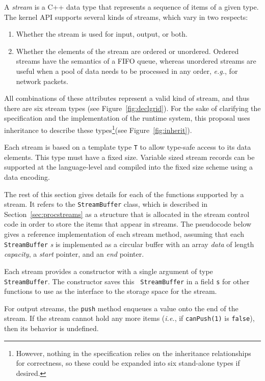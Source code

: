 A {\it stream} is a C++ data type that represents a sequence of items
of a given type.  The kernel API supports several kinds of streams,
which vary in two respects: 
\begin{enumerate}

\item Whether the stream is used for input, output, or both.

\item Whether the elements of the stream are ordered or unordered.
Ordered streams have the semantics of a FIFO queue, whereas unordered
streams are useful when a pool of data needs to be processed in any
order, {\it e.g.}, for network packets.

\end{enumerate}
All combinations of these attributes represent a valid kind of stream,
and thus there are six stream types (see Figure~\ref{fig:declgrid}).
For the sake of clarifying the specification and the implementation of
the runtime system, this proposal uses inheritance to describe these
types\footnote{However, nothing in the specification relies on the
inheritance relationships for correctness, so these could be expanded
into six stand-alone types if desired.}(see Figure~\ref{fig:inherit}).

Each stream is based on a template type {\tt T} to allow type-safe
access to its data elements.  This type must have a fixed size.
Variable sized stream records can be supported at the language-level
and compiled into the fixed size scheme using a data encoding.

The rest of this section gives details for each of the functions
supported by a stream.  It refers to the {\tt StreamBuffer} class,
which is described in Section~\ref{sec:procstreams} as a structure
that is allocated in the stream control code in order to store the
items that appear in streams.  The pseudocode below gives a reference
implementation of each stream method, assuming that each {\tt
StreamBuffer} {\it s} is implemented as a circular buffer with an
array {\it data} of length {\it capacity}, a {\it start} pointer, and
an {\it end} pointer.

 Each stream provides a constructor with a single
argument of type {\tt StreamBuffer}.  The constructor saves this {\tt
StreamBuffer} in a field {\tt s} for other functions to use as the
interface to the storage space for the stream.

 For output streams, the {\tt push} method enqueues a value
onto the end of the stream.  If the stream cannot hold any more items
({\it i.e.}, if {\tt canPush(1)} is {\tt false}), then its behavior is
undefined.

